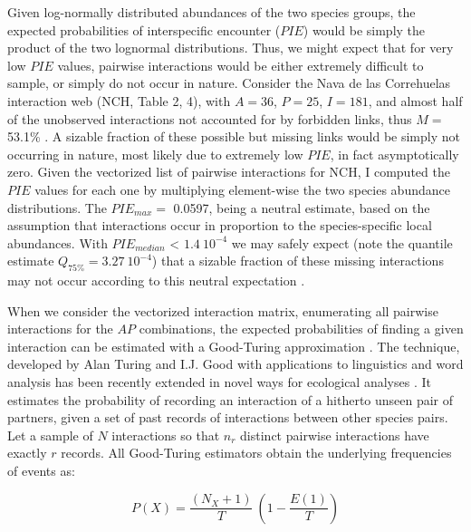 \documentclass[12pt]{article}
\begin{document}
Given log-normally distributed abundances of the two species groups, the expected probabilities of interspecific encounter ($PIE$) would be simply the product of the two lognormal distributions. Thus, we might expect that for very low $PIE$ values, pairwise interactions would be either extremely difficult to sample, or simply do not occur in nature. Consider the Nava de las Correhuelas interaction web (NCH, Table 2, 4), with $A= 36$, $P= 25$, $I= 181$, and almost half of the unobserved interactions not accounted for by forbidden links, thus $M=$ 53.1\% \citep{Jordano:2009c}. A sizable fraction of these possible but missing links would be simply not occurring in nature, most likely due to extremely low $PIE$, in fact asymptotically zero. Given the vectorized list of pairwise interactions for NCH, I computed the $PIE$ values for each one by multiplying element-wise the two species abundance distributions. The ${PIE}_{max}=$ 0.0597, being a neutral estimate, based on the assumption that interactions occur in proportion to the species-specific local abundances. With $PIE_{median}$ < $1.4\ 10^{-4}$ we may safely expect (note the quantile estimate $Q_{75\%}= $$3.27\ 10^{-4}$) that a sizable fraction of these missing interactions may  not occur according to this neutral expectation \citep{E31/2562,Olesen:2011a} \citep[neutral forbidden links, \emph{sensu}][]{Canard:2012jy}.  

When we consider the vectorized interaction matrix, enumerating all pairwise interactions for the $AP$ combinations, the expected probabilities of finding a given interaction can be estimated with a Good-Turing approximation \citep{Good:1953tn}. The technique, developed by Alan Turing and I.J. Good with applications to linguistics and word analysis \citep{Gale:1995uy} has been recently extended in novel ways for ecological analyses \citep{Chao:2015tc}. It estimates the probability of recording an interaction of a hitherto unseen pair of partners, given a set of past records of interactions between other species pairs. Let a sample of $N$ interactions so that $n_r$ distinct pairwise interactions have exactly $r$ records. All Good-Turing estimators obtain the underlying frequencies of events as:

\begin{equation}
P(X)= \frac{(N_X + 1)}{T}\ (1-\frac{E(1)}{T})
\end{equation}
\end{document}
